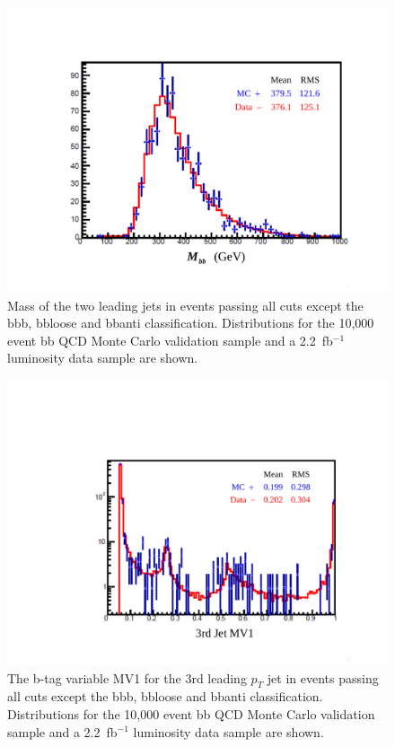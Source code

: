 \begin{figure}
  \includegraphics[width=0.70\linewidth]{MonteCarlo/figures/mbb_bbqcd_vs_data.pdf}
  \caption{Mass of the two leading jets in events passing all cuts except the
bbb, bbloose and bbanti classification.  Distributions for the 10,000 event bb QCD Monte Carlo validation sample
and a 2.2~fb$^{-1}$ luminosity data sample are shown.    \label{fig:mbb_bbqcd_vs_data}}
\end{figure}

\begin{figure}
  \includegraphics[width=0.70\linewidth]{MonteCarlo/figures/mv1_jet3_bbqcd_vs_data.pdf}
  \caption{The b-tag variable MV1 for the 3rd leading $p_T$ jet in events passing all cuts except the
bbb, bbloose and bbanti classification.     Distributions for the 10,000 event bb QCD Monte Carlo validation sample
and a 2.2~fb$^{-1}$ luminosity data sample are shown.    \label{fig:mv1_jet3_bbqcd_vs_data}}
\end{figure}




